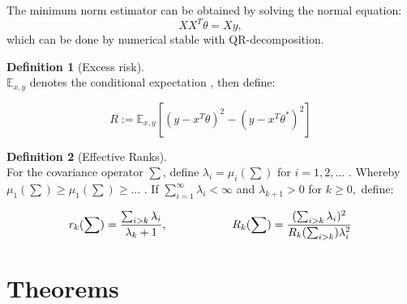 \documentclass[a4paper,12pt]{scrartcl}
\theoremstyle{definition}
\newtheorem{definition}{Definition}[section]
\begin{document}
The minimum norm estimator can be obtained by solving the normal equation:
\begin{equation}
\label{eq:normal_equation}
	XX^T \theta = X y,
\end{equation}
which can be done by numerical stable with QR-decomposition.

\newpage

\begin{definition} [Excess risk] 
	\label{def:Excess risk}\ \\
	
	$\mathbb{E}_{x,y}$ denotes the conditional expectation , then define: 
	
	\begin{equation}
	R:= \mathbb{E}_{x,y}[(y - x^T\theta)^2 - (y - x^T\theta^*)^2]
	\end{equation} 
\end{definition}


\begin{definition} [Effective Ranks] 
	\label{def:Effective Ranks}\ \\
	
	For the covariance operator $\sum$, define $\lambda_i = \mu_i(\sum)$ for $i = 1,2,...$ . Whereby \newline $\mu_1(\sum) \geq \mu_1(\sum) \geq ...$ . If $\sum\limits_{i=1}^\infty \lambda_i < \infty$ and $\lambda_{k+1} > 0$ for $k \geq 0,$ define: 
	
	\begin{equation}
	r_k(\sum) = \frac{\sum_{i>k}\lambda_i}{\lambda_k+1} ,\hspace*{2cm}
    R_k(\sum) = \frac{(\sum_{i>k}\lambda_i)^2}{R_k(\sum_{i>k})\lambda_i^2}
	\end{equation} 
\end{definition}

\newpage
\section{Theorems} \label{sec:Theoreme}

\newtheorem{thm}{Theorem}
\end{document}
